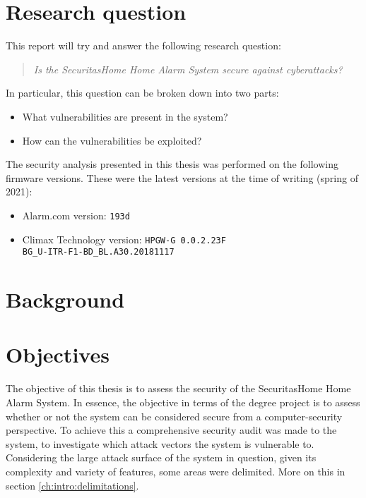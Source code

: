 \section{Research question} \label{ch:intro:research-question}
This report will try and answer the following research question:

\begin{quote}
    \textit{Is the SecuritasHome Home Alarm System secure against cyberattacks?}
\end{quote}

\noindent In particular, this question can be broken down into two parts:

\begin{itemize}
    \item What vulnerabilities are present in the system?
    \item How can the vulnerabilities be exploited?
\end{itemize}

\noindent The security analysis presented in this thesis was performed on the following firmware versions. These were the latest versions at the time of writing (spring of 2021):
\begin{itemize}
    \item Alarm.com version: \texttt{193d}
    \item Climax Technology version: \texttt{HPGW-G 0.0.2.23F\\ BG\_U-ITR-F1-BD\_BL.A30.20181117}
\end{itemize}

\section{Background} \label{ch:intro:background}
\todo

\section{Objectives} \label{ch:intro:objectives}
The objective of this thesis is to assess the security of the SecuritasHome Home Alarm System. In essence, the objective in terms of the degree project is to assess whether or not the system can be considered secure from a computer-security perspective. To achieve this a comprehensive security audit was made to the system, to investigate which attack vectors the system is vulnerable to. Considering the large attack surface of the system in question, given its complexity and variety of features, some areas were delimited. More on this in section \ref{ch:intro:delimitations}.


